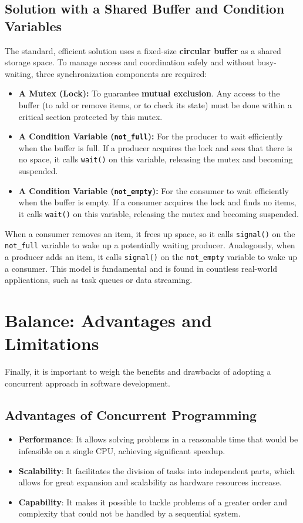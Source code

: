 \subsection{Solution with a Shared Buffer and Condition Variables}
The standard, efficient solution uses a fixed-size \textbf{circular buffer} as a shared storage space. To manage access and coordination safely and without busy-waiting, three synchronization components are required:
\begin{itemize}
    \item \textbf{A Mutex (Lock):} To guarantee \textbf{mutual exclusion}. Any access to the buffer (to add or remove items, or to check its state) must be done within a critical section protected by this mutex.
    \item \textbf{A Condition Variable (\texttt{not\_full}):} For the producer to wait efficiently when the buffer is full. If a producer acquires the lock and sees that there is no space, it calls \texttt{wait()} on this variable, releasing the mutex and becoming suspended.
    \item \textbf{A Condition Variable (\texttt{not\_empty}):} For the consumer to wait efficiently when the buffer is empty. If a consumer acquires the lock and finds no items, it calls \texttt{wait()} on this variable, releasing the mutex and becoming suspended.
\end{itemize}
When a consumer removes an item, it frees up space, so it calls \texttt{signal()} on the \texttt{not\_full} variable to wake up a potentially waiting producer. Analogously, when a producer adds an item, it calls \texttt{signal()} on the \texttt{not\_empty} variable to wake up a consumer. This model is fundamental and is found in countless real-world applications, such as task queues or data streaming.

\section{Balance: Advantages and Limitations}
Finally, it is important to weigh the benefits and drawbacks of adopting a concurrent approach in software development.

\subsection{Advantages of Concurrent Programming}
\begin{itemize}
    \item \textbf{Performance}: It allows solving problems in a reasonable time that would be infeasible on a single CPU, achieving significant speedup.
    \item \textbf{Scalability}: It facilitates the division of tasks into independent parts, which allows for great expansion and scalability as hardware resources increase.
    \item \textbf{Capability}: It makes it possible to tackle problems of a greater order and complexity that could not be handled by a sequential system.
\end{itemize}

